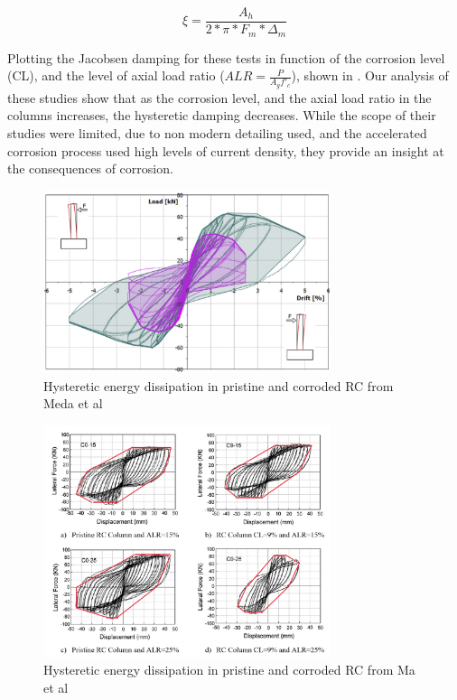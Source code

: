 \begin{equation}
    \xi=\frac{A_h}{2*\pi*F_m*\Delta_m}
    \label{eq:JacobsenEquation}
\end{equation}

Plotting the Jacobsen damping for these tests in function of the corrosion level (CL), and the level of axial load ratio ($ALR=\frac{P}{A_{g}f'_{c}}$), shown in . Our analysis of these studies show that as the corrosion level, and the axial load ratio in the columns increases, the hysteretic damping decreases. While the scope of their studies were limited, due to non modern detailing used, and the accelerated corrosion process used high levels of current density, they provide an insight at the consequences of corrosion. 

\begin{figure}[htbp]
	\centering
    \includegraphics[width=0.75\textwidth]{VAC Prelim 2.0/Chapter-5/figs/Meda_HystereticArea_01.png}
	\caption{Hysteretic energy dissipation in pristine and corroded RC from Meda et al \cite{Meda2014}}
	\label{fig:MedaJacobsen}
\end{figure}

\begin{figure}[htbp]
	\centering
    \includegraphics[width=0.75\textwidth]{VAC Prelim 2.0/Chapter-5/figs/Ma_HystereticArea_01.png}
	\caption{Hysteretic energy dissipation in pristine and corroded RC from Ma et al \cite{Meda2014}}
	\label{fig:MaJacobsen}
\end{figure}

